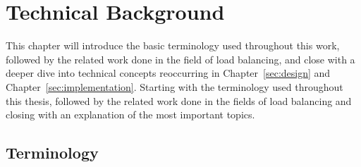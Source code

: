 \chapter{Technical Background}
\label{sec:state}






This chapter will introduce the basic terminology used throughout this work, followed by the related work done in the field of load balancing, and close with a deeper dive into technical concepts reoccurring in Chapter~\ref{sec:design} and Chapter~\ref{sec:implementation}.
Starting with the terminology used throughout this thesis, followed by the related work done in the fields of load balancing and closing with an explanation of the most important topics.

\section{Terminology}

